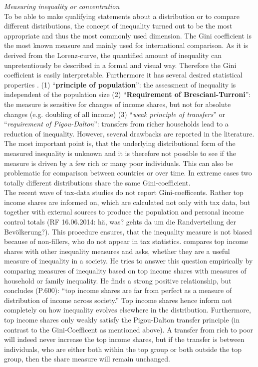 \documentclass[twoside]{article}\usepackage[]{graphicx}\usepackage[]{color}
\begin{document}
\begin{multicols}{2}
\emph{Measuring inequality or concentration} \\
To be able to make qualifying statements about a distribution or to compare different distributions, the concept of inequality turned out to be the most appropriate and thus the most commonly used dimension. The Gini coefficient is the most known measure and mainly used for international comparison. As it is derived from the Lorenz-curve, the quantified amount of inequality can unpretentiously be described in a formal and visual way. Therefore the Gini coefficient is easily interpretable. Furthermore it has several desired statistical properties \citet{engelhardt_modelle_2000}. (1) ``\textbf{principle of population}'': the assessment of inequality is independent of the population size (2) ``\textbf{Requirement of Bresciani-Turroni}'': the measure is sensitive for changes of income shares, but not for absolute changes (e.g. doubling of all income) (3) ``\emph{weak principle of transfers}'' or ``\emph{requirement of Pigou-Dalton}'': transfers from richer households lead to a reduction of inequality. However, several drawbacks are reported in the literature. The most important point is, that the underlying distributional form of the measured inequality is unknown and it is therefore not possible to see if the measure is driven by a few rich or many poor individuals. This can also be problematic for comparison between countries or over time. In extreme cases two totally different distributions share the same Gini-coefficient.\\


The recent wave of tax-data studies do not report Gini-coefficents. Rather top income shares are informed on, which are calculated not only with tax data, but together with external sources to produce the population and personal income control totals (RF 16.06.2014: hä, was? gehts da um die Randverteilung der Bevölkerung?). This procedure ensures, that the inequality measure is not biased because of non-fillers, who do not appear in tax statistics.  \citet{leigh_how_2007} compares top income shares with other inequality measures and asks, whether they are a useful measure of inequality in a society. He tries to answer this question empirically by comparing measures of inequality based on top income shares with measures of household or family inequality. He finds a strong positive relationship, but concludes (P.600): ``top income shares are far from perfect as a measure of distribution of income across society.'' Top income shares hence inform not completely on how inequality evolves elsewhere in the distribution. Furthermore, top income shares only weakly satisfy the Pigou-Dalton transfer principle (in contrast to the Gini-Coefficent as mentioned above). A transfer from rich to poor will indeed never increase the top income shares, but if the transfer is between individuals, who are either both within the top group or both outside the top group, then the share measure will remain unchanged. \\


\end{multicols}
\end{document}
